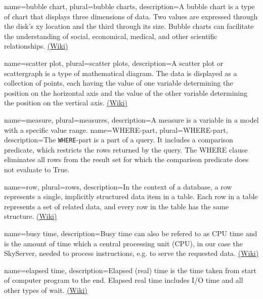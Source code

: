 {
  name=bubble chart,
  plural=bubble charts,
  description={A bubble chart is a type of chart that displays three 
  dimensions of data. Two values are expressed through the disk's xy location and the third 
  through its size. Bubble charts can facilitate the understanding of social,
economical, medical, and other scientific relationships. \href{http://en.wikipedia.org/wiki/Bubble_chart}{(Wiki)}}
}


{
  name=scatter plot,
  plural=scatter plots,
  description={A scatter plot or scattergraph is a type of mathematical diagram. 
  The data is displayed as a collection of points, each having the value of one 
  variable determining the position on the horizontal axis and the value of the other 
  variable determining the position on the vertical axis. \href{http://en.wikipedia.org/wiki/Scatter_plot}{(Wiki)}}
}


{
  name=measure,
  plural=measures,
  description={A measure is a variable in a model with a specific value range.}
}
{
  name=WHERE-part,
  plural=WHERE-part,
  description={The \texttt{WHERE}-part is a part of a \gls{query}. It includes a comparison predicate, 
  which restricts the \glspl{row} returned by the \gls{query}. 
  The WHERE clause eliminates all rows from the result set 
  for which the comparison predicate does not evaluate to True.}
}


{
  name=row,
  plural=rows,
  description={In the context of a \gls{database}, a row represents a single, implicitly 
  structured data item in a table. Each row in a table represents a set of related data, 
  and every row in the table has the same structure.
  \href{(http://en.wikipedia.org/wiki/Row_(database))}{(Wiki)}}
}


{
  name=busy time,
  description={Busy time can also be refered to as CPU time and is the amount of time which a 
  central processing unit (CPU), in our case the \gls{SkyServer}, needed to process instructions,
   e.g. to serve the requested data. \href{(http://en.wikipedia.org/wiki/CPU_time)}{(Wiki)}}
}


{
  name=elapsed time,
  description={Elapsed (real) time is the time taken from start of computer program to the end. 
  Elapsed real time includes I/O time and all other types of wait. 
  \href{(http://en.wikipedia.org/wiki/Elapsed_real_time)}{(Wiki)}}
}


